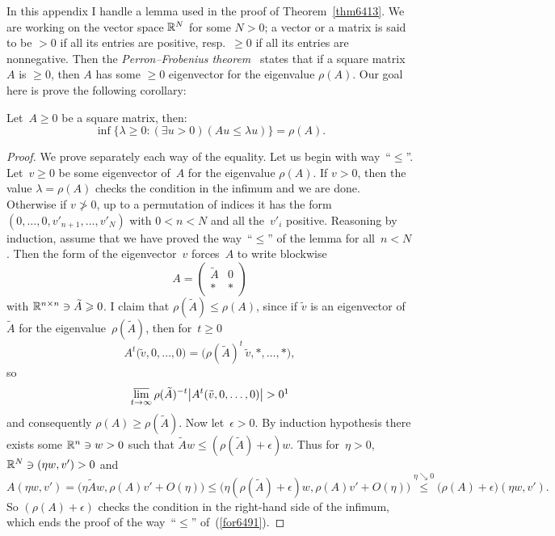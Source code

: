 In this appendix I handle a lemma used
in the proof of Theorem~\ref{thm6413}.
We are working on the vector space $\mathbb{R}^N$ for some $N>0$;
a vector or a matrix is said to be ${>0}$ if all its entries are positive,
resp.~${\geq 0}$ if all its entries are nonnegative.
Then the \emph{Perron--Frobenius theorem}~\cite[Theorem~8.3.1]{HornJohnson} states that
if a square matrix $A$ is ${\geq 0}$, then $A$ has some ${\geq 0}$ eigenvector
for the eigenvalue $\rho(A)$. Our goal here is prove the following corollary:
%
\begin{Lem}\label{l3542}
Let~$A \geq 0$ be a square matrix,
then:
\[\label{for6491} \inf \big\{ \lambda\geq 0 \colon (\exists u > 0)(Au \leq \lambda u) \big\} = \rho(A) .\]
\end{Lem}

\begin{proof}
We prove separately each way of the equality.
Let us begin with way~``$\leq$''.
Let~$v \geq 0$ be some eigenvector of~$A$ for the eigenvalue $\rho(A)$.
If $v > 0$, then the value $\lambda = \rho(A)$ checks the condition in the infimum and we are done.
Otherwise if $v \ngtr 0$, up to a permutation of indices it has the form
$(0,\ldots,0,v'_{n+1},\ldots,v'_N)$ with $0<n<N$ and all the~$v'_i$ positive.
Reasoning by induction,
assume that we have proved the way~``$\leq$'' of the lemma
for all~$n<N$.
Then the form of the eigenvector~$v$ forces~$A$ to write blockwise
\[ A = \left( \begin{array}{cc} \tilde{A} & 0 \\ * & * \end{array} \right) \]
with $\RR^{n\times n} \ni \tilde{A} \geq 0$.
I claim that $\rho(\tilde{A}) \leq \rho(A)$, since
if $\tilde{v}$ is an eigenvector of~$\tilde{A}$ for the eigenvalue~$\rho(\tilde{A})$,
then for~$t \geq 0$
\[ A^{t} \big(\tilde{v},0,\ldots,0\big) = \big(\rho(\tilde{A})^{t}\,\tilde{v},*,\ldots,*\big) ,\]
so
\[\label{for5711}
\limsup_{t\longto\infty} \rho(\tilde{A})^{-t} \big|A^{t}(\tilde{v},0,\ldots,0)\big| > 0 \footnotemark \]
%
and consequently $\rho(A) \geq \rho(\tilde{A})$.
Now let~$\epsilon > 0$.
By induction hypothesis
there exists some $\mathbb{R}^n \ni w \allowbreak > 0$ such
that $\tilde{A}w \leq {(\rho(\tilde{A})+\epsilon) w}$.
Thus for~$\eta>0$, $\mathbb{R}^N \ni (\eta w,v') > 0$ and
\[
A(\eta w,v') = \big( \eta \tilde{A} w,\rho(A)v'+O(\eta) \big)
\leq \big( \eta (\rho(\tilde{A})+\epsilon) w, \rho(A)v' + O(\eta) \big)
\stackrel{\eta \searrow 0}{\leq} \big(\rho(A)+\epsilon\big) (\eta w, v') .
\]
So $(\rho(A)+\epsilon)$ checks the condition in the right-hand side of the infimum,
which ends the proof of the way~``$\leq$'' of~(\ref{for6491}).


\end{proof}

